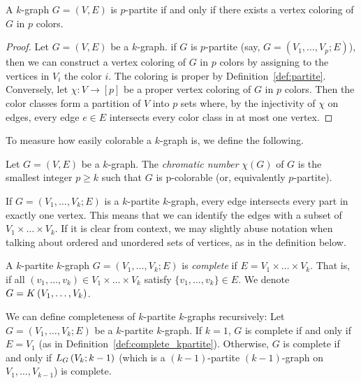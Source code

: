 \begin{proposition}
    A $k$-graph $G = (V, E)$ is $p$-partite if and only if
    there exists a vertex coloring of $G$ in $p$ colors.
    \begin{proof}
        Let $G = (V, E)$ be a $k$-graph.
        if $G$ is $p$-partite (say, $G = (V_1, \dots, V_p; E)$),
        then we can construct a vertex coloring of $G$ in $p$ colors
        by assigning to the vertices in $V_i$ the color $i$.
        The coloring is proper by Definition~\ref{def:partite}.
        Conversely, let $\chi: V \to [p]$ be a proper vertex coloring of $G$ in $p$ colors.
        Then the color classes form a partition of $V$ into $p$ sets where, by the injectivity of $\chi$ on edges,
        every edge $e \in E$ intersects every color class in at most one vertex.
    \end{proof}
\end{proposition}

To measure how easily colorable a $k$-graph is, we define the following.

\begin{definition}
    Let $G = (V, E)$ be a $k$-graph.
    The \emph{chromatic number} $\chi(G)$ of $G$ is the smallest integer $p \geq k$ such that
    $G$ is p-colorable (or, equivalently $p$-partite).
\end{definition}

If $G = (V_1, \dots, V_k; E)$ is a $k$-partite $k$-graph,
every edge intersects every part in exactly one vertex.
This means that we can identify the edges with a subset of $ V_1 \times \dots \times V_k$.
If it is clear from context, we may slightly abuse notation when talking about ordered and
unordered sets of vertices, as in the definition below.


\begin{definition} \label{def:complete_kpartite}
    A $k$-partite $k$-graph $G = (V_1, \dots, V_k; E)$ is \emph{complete}
    if $E = V_1 \times \dots \times V_k$.
    That is, if all $(v_1, \dots, v_k) \in V_1 \times \dots \times V_k$
    satisfy $\{v_1, \dots, v_k\} \in E$.
    We denote $G = K\left(V_1, \dots, V_k\right)$.
\end{definition}

We can define completeness of $k$-partite $k$-graphs recursively: Let $G = (V_1, \dots, V_k; E)$
be a $k$-partite $k$-graph.
If $k=1$, $G$ is complete if and only if $E = V_1$ (as in Definition~\ref{def:complete_kpartite}).
Otherwise, $G$ is complete if and only if $L_{G}\left(V_k; k-1\right)$ (which is a $(k-1)$-partite $(k-1)$-graph
on $V_1, \dots, V_{k-1}$) is complete.

